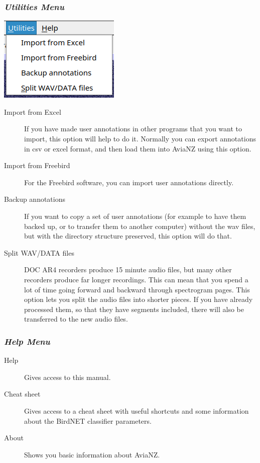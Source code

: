 \documentclass{scrartcl}
\begin{document}
\subsubsection{\textit{Utilities Menu} \label{sec:utilities}}

\begin{center}
\includegraphics[width=.3\textwidth]{Figures/UtilitiesMenu}
\end{center}

\begin{description}
\item [Import from Excel] If you have made user annotations in other programs that you want to import, this option will help to do it. Normally you can export annotations in csv or excel format, and then load them into AviaNZ using this option.
\item [Import from Freebird] For the Freebird software, you can import user annotations directly.
\item[Backup annotations] If you want to copy a set of user annotations (for example to have them backed up, or to transfer them to another computer) without the wav files, but with the directory structure preserved, this option will do that. 
\item[Split WAV/DATA files] DOC AR4 recorders produce 15 minute audio files, but many other recorders produce far longer recordings. This can mean that you spend a lot of time going forward and backward through spectrogram pages. This option lets you split the audio files into shorter pieces. If you have already processed them, so that they have segments included, there will also be transferred to the new audio files.
\end{description}

\subsubsection{\textit{Help Menu}}

\begin{description}
\item [Help] Gives access to this manual.
\item [Cheat sheet] Gives access to a cheat sheet with useful shortcuts and some information about the BirdNET classifier parameters.
\item[About] Shows you basic information about AviaNZ.
\end{description}
\end{document}
